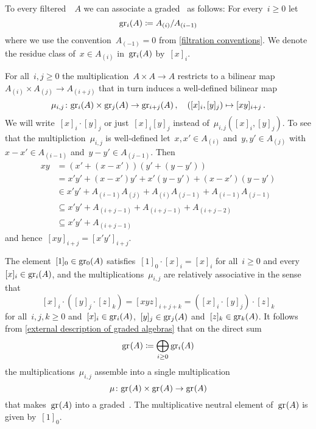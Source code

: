 \begin{construction}
  \label{construction of associated graded}
  To every filtered~{\algebra{$\kf$}}~$A$ we can associate a graded~{\algebra{$\kf$}} as follows:
  For every~$i \geq 0$ let
  \[
    \gr[i](A)
    \defined
    A_{(i)} / A_{(i-1)}
  \]
  where we use the convention~$A_{(-1)} = 0$ from \cref{filtration conventions}.
  We denote the residue class of~$x \in A_{(i)}$ in~$\gr[i](A)$ by~$[x]_i$.
  
  For all~$i, j \geq 0$ the multiplication~$A \times A \to A$ restricts to a bilinear map~$A_{(i)} \times A_{(j)} \to A_{(i+j)}$ that in turn induces a well-defined bilinear map
  \[
    \mu_{i,j}
    \colon
    \gr[i](A) \times \gr[j](A)
    \to
    \gr[i+j](A) \,,
    \quad
    ([x]_i, [y]_j)
    \mapsto
    [xy]_{i+j}  \,.
  \]
  We will write~$[x]_i \cdot [y]_j$ or just~$[x]_i [y]_j$ instead of~$\mu_{i,j}([x]_i, [y]_j)$.
  To see that the multipliction~$\mu_{i,j}$ is well-defined let~$x, x' \in A_{(i)}$ and~$y, y' \in A_{(j)}$ with~$x - x ' \in A_{(i-1)}$ and~$y - y' \in A_{(j-1)}$.
  Then
  \begin{align*}
    x y
    &=
    (x' + (x - x')) (y' + (y - y'))
    \\
    &=
    x' y' + (x - x') y' + x' (y - y') + (x - x')(y - y')
    \\
    &\in
    x' y' + A_{(i-1)} A_{(j)} + A_{(i)} A_{(j-1)} + A_{(i-1)} A_{(j-1)}
    \\
    &\subseteq
    x' y' + A_{(i+j-1)} + A_{(i+j-1)} + A_{(i+j-2)}
    \\
    &\subseteq
    x' y' + A_{(i+j-1)}
  \end{align*}
  and hence~$[xy]_{i+j} = [x'y']_{i+j}$.
  
  The element~$[1]_0 \in \gr[0](A)$ satisfies~$[1]_0 \cdot [x]_i = [x]_i$ for all~$i \geq 0$ and every~$[x]_i \in \gr[i](A)$, and the multiplications~$\mu_{i,j}$ are relatively associative in the sense that
  \[
    [x]_i \cdot ([y]_j \cdot [z]_k)
    =
    [xyz]_{i+j+k}
    =
    ([x]_i \cdot [y]_j) \cdot [z]_k
  \]
  for all~$i, j, k \geq 0$ and~$[x]_i \in \gr[i](A)$,~$[y]_j \in \gr[j](A)$ and~$[z]_k \in \gr[k](A)$.
  It follows from \cref{external description of graded algebras} that on the direct sum
  \[
    \gr(A)
    \defined
    \bigoplus_{i \geq 0} \gr[i](A)
  \]
  the multiplications~$\mu_{i,j}$ assemble into a single multiplication
  \[
    \mu
    \colon
    \gr(A) \times \gr(A)
    \to
    \gr(A)
  \]
  that makes~$\gr(A)$ into a graded~{\algebra{$\kf$}}.
  The multiplicative neutral element of~$\gr(A)$ is given by~$[1]_0$.
\end{construction}


